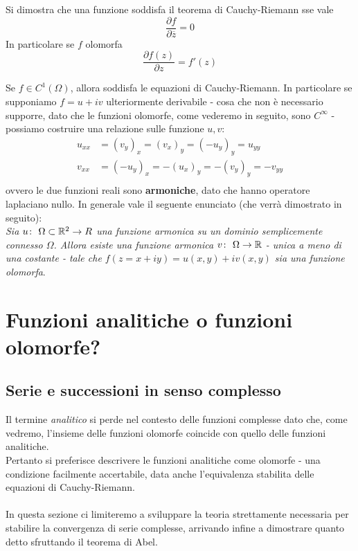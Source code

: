 \begin{remark}
	Si dimostra che una funzione soddisfa il teorema di Cauchy-Riemann sse vale 
	\begin{equation*}
		\frac{\partial f}{\partial \overline{z}} = 0
	\end{equation*}
	In particolare se $f$ olomorfa 
	\begin{equation*}
		\frac{\partial f(z)}{\partial z} = f'(z) 
	\end{equation*}
\end{remark}

\begin{remark}
	Se $f \in C^1(\Omega)$, allora soddisfa le equazioni di Cauchy-Riemann. In particolare se supponiamo $f = u+iv$ ulteriormente derivabile - cosa che non è necessario supporre, dato che le funzioni olomorfe, come vederemo in seguito, sono $C^\infty$ - possiamo costruire una relazione sulle funzione $u,v$:
	\begin{equation*}
	\begin{aligned}	
		u_{xx} & = (v_y)_x = (v_x)_y = (-u_y)_y = u_{yy} \\
		v_{xx} & = (-u_y)_x = -(u_x)_y = -(v_y)_y = -v_{yy}\\
	\end{aligned}
	\end{equation*}
	ovvero le due funzioni reali sono \textbf{armoniche}, dato che hanno operatore laplaciano nullo. In generale vale il seguente enunciato (che verrà dimostrato in seguito):\\
	
	\textit{Sia $u \colon\ \Omega \subset \mathbb{R}^2 \rightarrow R$ una funzione armonica su un dominio semplicemente connesso $\Omega$. Allora esiste una funzione armonica $v \colon\ \Omega \rightarrow \mathbb{R}$ - unica a meno di una costante - tale che $f(z=x+iy) = u(x,y) + iv(x,y)$ sia una funzione olomorfa}.
\end{remark}		

\section{Funzioni analitiche o funzioni olomorfe?}
\subsection{\textcolor{AnComp}{\textbf{Serie e successioni in senso complesso}}}

Il termine \textit{analitico} si perde nel contesto delle funzioni complesse dato che, come vedremo, l'insieme delle funzioni olomorfe coincide con quello delle funzioni analitiche. \\ Pertanto si preferisce descrivere le funzioni analitiche come olomorfe - una condizione facilmente accertabile, data anche l'equivalenza stabilita delle equazioni di Cauchy-Riemann. \\ \\ In questa sezione ci limiteremo a sviluppare la teoria strettamente necessaria per stabilire la convergenza di serie complesse, arrivando infine a dimostrare quanto detto sfruttando il teorema di Abel.\\

